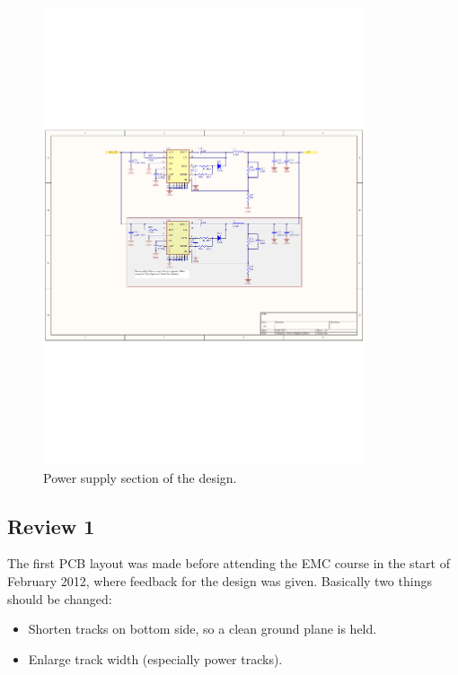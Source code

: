 \begin{figure}[H]
	\begin{centering}
		 \includegraphics[width=0.85\textwidth,page=1,angle=0]{images/SIG60_v0_4}
		\caption{Power supply section of the design.}
	\end{centering}
\end{figure}

\subsection{Review 1}
The first PCB layout was made before attending the EMC course in the start of February 2012, where feedback for the design was given. Basically two things should be changed:
\begin{itemize}
	\item Shorten tracks on bottom side, so a clean ground plane is held. 
	\item Enlarge track width (especially power tracks).
\end{itemize}

